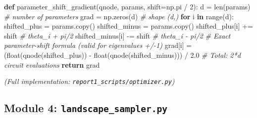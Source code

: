\documentclass[
  11pt,
]{report}
\newenvironment{Shaded}{}{}
\newcommand{\BuiltInTok}[1]{\textcolor[rgb]{0.00,0.50,0.00}{#1}}
\newcommand{\CommentTok}[1]{\textcolor[rgb]{0.38,0.63,0.69}{\textit{#1}}}
\newcommand{\ControlFlowTok}[1]{\textcolor[rgb]{0.00,0.44,0.13}{\textbf{#1}}}
\newcommand{\DecValTok}[1]{\textcolor[rgb]{0.25,0.63,0.44}{#1}}
\newcommand{\FloatTok}[1]{\textcolor[rgb]{0.25,0.63,0.44}{#1}}
\newcommand{\KeywordTok}[1]{\textcolor[rgb]{0.00,0.44,0.13}{\textbf{#1}}}
\newcommand{\NormalTok}[1]{#1}
\newcommand{\OperatorTok}[1]{\textcolor[rgb]{0.40,0.40,0.40}{#1}}
\begin{document}
\begin{Shaded}
\begin{Highlighting}[]
\KeywordTok{def}\NormalTok{ parameter\_shift\_gradient(qnode, params, shift}\OperatorTok{=}\NormalTok{np.pi }\OperatorTok{/} \DecValTok{2}\NormalTok{):}
\NormalTok{    d }\OperatorTok{=} \BuiltInTok{len}\NormalTok{(params)                    }\CommentTok{\# number of parameters}
\NormalTok{    grad }\OperatorTok{=}\NormalTok{ np.zeros(d)                 }\CommentTok{\# shape (d,)}
    \ControlFlowTok{for}\NormalTok{ i }\KeywordTok{in} \BuiltInTok{range}\NormalTok{(d):}
\NormalTok{        shifted\_plus }\OperatorTok{=}\NormalTok{ params.copy()}
\NormalTok{        shifted\_minus }\OperatorTok{=}\NormalTok{ params.copy()}
\NormalTok{        shifted\_plus[i] }\OperatorTok{+=}\NormalTok{ shift       }\CommentTok{\# theta\_i + pi/2}
\NormalTok{        shifted\_minus[i] }\OperatorTok{{-}=}\NormalTok{ shift      }\CommentTok{\# theta\_i {-} pi/2}
        \CommentTok{\# Exact parameter{-}shift formula (valid for eigenvalues +/{-}1)}
\NormalTok{        grad[i] }\OperatorTok{=}\NormalTok{ (}\BuiltInTok{float}\NormalTok{(qnode(shifted\_plus)) }\OperatorTok{{-}} \BuiltInTok{float}\NormalTok{(qnode(shifted\_minus))) }\OperatorTok{/} \FloatTok{2.0}
    \CommentTok{\# Total: 2*d circuit evaluations}
    \ControlFlowTok{return}\NormalTok{ grad}
\end{Highlighting}
\end{Shaded}

\emph{(Full implementation: \texttt{report1\_scripts/optimizer.py})}

\subsection{\texorpdfstring{Module 4:
\texttt{landscape\_sampler.py}}{Module 4: landscape\_sampler.py}}\label{module-4-landscape_sampler.py}
\end{document}
